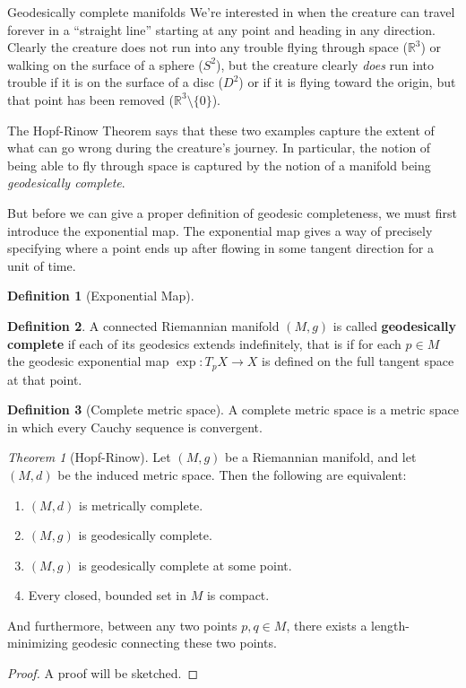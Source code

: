 \documentclass{article}
\newcommand{\fn}[3]{#1 \colon #2 \rightarrow #3}
\theoremstyle{definition}
\newtheorem{definition}{Definition}[section]
\theoremstyle{remark}
\newtheorem{theorem}{Theorem}[section]
\begin{document}
\begin{section}{Geodesically complete manifolds}
  We're interested in when the creature can travel forever in a
  ``straight line'' starting at any point and heading in any direction.
  Clearly the creature does not run into any trouble flying through space
  ($\mathbb R^3$) or walking on the surface of a sphere ($S^2$), but the creature
  clearly \textit{does} run into trouble if it is on the surface of a disc
  ($D^2$) or if it is flying toward the origin, but that point has been
  removed ($\mathbb R^3 \setminus \{ 0 \}$).

    The Hopf-Rinow Theorem says that these two examples capture the extent of what
  can go wrong during the creature's journey. In particular, the notion of being able
  to fly through space is captured by the notion of a manifold being
  \textit{geodesically complete}.

  But before we can give a proper definition of geodesic completeness, we must
  first introduce the exponential map. The exponential map gives a way of
  precisely specifying where a point ends up after flowing in some tangent
  direction for a unit of time.
  \begin{definition}[Exponential Map] %

  \end{definition}

  \begin{definition}
    A connected Riemannian manifold $(M, g)$ is called \textbf{geodesically complete}
    if each of its geodesics extends indefinitely, that is if for each $p \in M$
    the geodesic exponential map $\fn \exp {T_pX} X$  is defined on the full
    tangent space at that point.
  \end{definition}

  \begin{definition}[Complete metric space]
    A complete metric space is a metric space in which every Cauchy sequence is
    convergent.
  \end{definition}
  \begin{theorem}[Hopf-Rinow]
    Let $(M, g)$ be a Riemannian manifold, and let $(M, d)$ be the induced
    metric space. Then the following are equivalent:
    \begin{enumerate}
      \item $(M, d)$ is metrically complete.
      \item $(M, g)$ is geodesically complete.
      \item $(M, g)$ is geodesically complete at some point.
      \item Every closed, bounded set in $M$ is compact. %
    \end{enumerate}
    And furthermore, between any two points $p, q \in M$, there exists a length-minimizing geodesic connecting these two points.
  \end{theorem}
  \begin{proof}
    A proof will be sketched.
  \end{proof}
\end{section}
\end{document}
